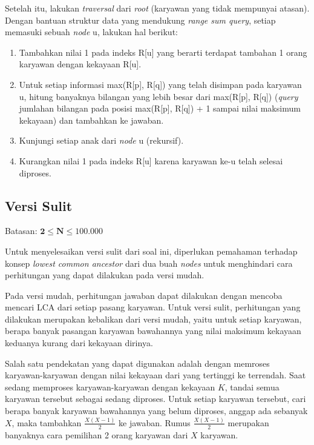\documentclass[../main_editorial.tex]{subfiles} %
\begin{document}
Setelah itu, lakukan \textit{traversal} dari \textit{root} (karyawan yang tidak mempunyai atasan). Dengan bantuan struktur data yang mendukung \textit{range sum query}, setiap memasuki sebuah \textit{node} u, lakukan hal berikut:
\begin{enumerate}
	\item Tambahkan nilai 1 pada indeks R[u] yang berarti terdapat tambahan 1 orang karyawan dengan kekayaan R[u].
	\item Untuk setiap informasi max(R[p], R[q]) yang telah disimpan pada karyawan u, hitung banyaknya bilangan yang lebih besar dari max(R[p], R[q]) (\textit{query} jumlahan bilangan pada posisi max(R[p], R[q]) + 1 sampai nilai maksimum kekayaan) dan tambahkan ke jawaban.
	\item Kunjungi setiap anak dari \textit{node} u (rekursif).
	\item Kurangkan nilai 1 pada indeks R[u] karena karyawan ke-u telah selesai diproses.
\end{enumerate}

\subsection*{Versi Sulit}

Batasan: $\mathbf{2 \le N \le 100.000}$

Untuk menyelesaikan versi sulit dari soal ini, diperlukan pemahaman terhadap konsep \textit{lowest common ancestor} dari dua buah \textit{nodes} untuk menghindari cara perhitungan yang dapat dilakukan pada versi mudah.

Pada versi mudah, perhitungan jawaban dapat dilakukan dengan mencoba mencari LCA dari setiap pasang karyawan. Untuk versi sulit, perhitungan yang dilakukan merupakan kebalikan dari versi mudah, yaitu untuk setiap karyawan, berapa banyak pasangan karyawan bawahannya yang nilai maksimum kekayaan keduanya kurang dari kekayaan dirinya.

Salah satu pendekatan yang dapat digunakan adalah dengan memroses karyawan-karyawan dengan nilai kekayaan dari yang tertinggi ke terrendah. Saat sedang memproses karyawan-karyawan dengan kekayaan $K$, tandai semua karyawan tersebut sebagai sedang diproses. Untuk setiap karyawan tersebut, cari berapa banyak karyawan bawahannya yang belum diproses, anggap ada sebanyak $X$, maka tambahkan $\frac{X (X - 1)}{2}$ ke jawaban. Rumus $\frac{X (X - 1)}{2}$ merupakan banyaknya cara pemilihan 2 orang karyawan dari $X$ karyawan.
\end{document}
